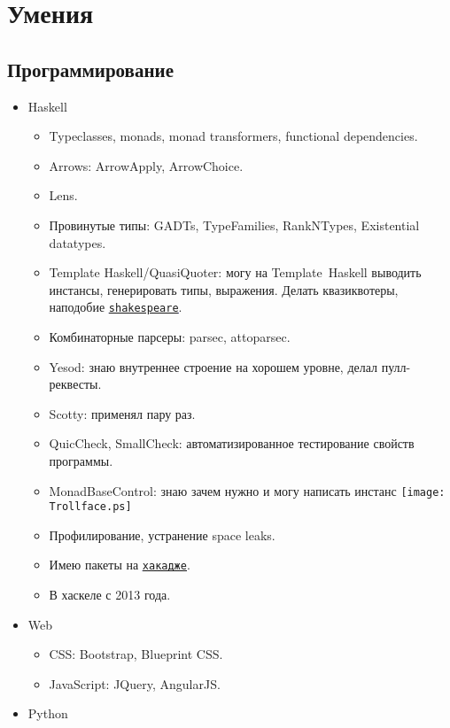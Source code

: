 \documentclass[11pt,a4paper,sans]{moderncv}
\newcommand*{\nlink}[2]{\textcolor{blue}{\texttt{\underline{\href{#1}{#2}}}}}
\begin{document}
\section{Умения}

\subsection{Программирование}

\begin{itemize}
\item Haskell
  \begin{itemize}
  \item Typeclasses, monads, monad transformers, functional dependencies.
  \item Arrows: ArrowApply, ArrowChoice.
  \item Lens.
  \item Провинутые типы: GADTs, TypeFamilies, RankNTypes, Existential datatypes.
  \item Template Haskell/QuasiQuoter: могу на \hbox{Template Haskell}
    выводить инстансы, генерировать типы, выражения. Делать
    квазиквотеры, наподобие
    \nlink{http://hackage.haskell.org/package/shakespeare}{shakespeare}.
  \item Комбинаторные парсеры: parsec, attoparsec.
  \item Yesod: знаю внутреннее строение на хорошем уровне, делал пулл-реквесты.
  \item Scotty: применял пару раз.
  \item QuicCheck, SmallCheck: автоматизированное тестирование свойств
    программы.
  \item MonadBaseControl: знаю зачем нужно и могу написать инстанс
    \texttt{[image: Trollface.ps]}
  \item Профилирование, устранение space leaks.
  \item Имею пакеты на
    \nlink{http://hackage.haskell.org/user/AlekseyUymanov}{хакадже}.
  \item В хаскеле с 2013 года.
  \end{itemize}
\item Web
  \begin{itemize}
  \item CSS: Bootstrap, Blueprint CSS.
  \item JavaScript: JQuery, AngularJS.
  \end{itemize}
\item Python
  \begin{itemize}

\end{itemize}
\end{itemize}
\end{document}
